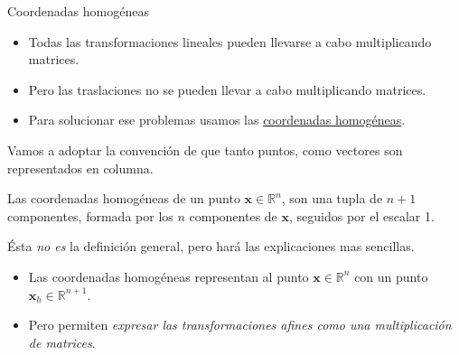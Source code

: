 \begin{frame}{Coordenadas homogéneas}

\begin{itemize}
    \item Todas las transformaciones lineales pueden llevarse a cabo multiplicando matrices.
    \item Pero las traslaciones no se pueden llevar a cabo multiplicando matrices.
    \item Para solucionar ese problemas usamos las \href{https://en.wikipedia.org/wiki/Homogeneous_coordinates}{coordenadas homogéneas}.
\end{itemize}
Vamos a adoptar la convención de que tanto puntos, como vectores son representados en columna.
\begin{block}{}
    Las coordenadas homogéneas de un punto $\mathbf{x} \in \mathbb{R}^n$, son una tupla de $n+1$ componentes, formada por los $n$ componentes de $\mathbf{x}$, seguidos por el escalar 1.
\end{block}
Ésta \emph{no es} la definición general, pero hará las explicaciones mas sencillas.
\begin{itemize}
    \item Las coordenadas homogéneas representan al punto $\mathbf{x} \in \mathbb{R}^n$ con un punto $\mathbf{x}_{h} \in \mathbb{R}^{n+1}$.
    \item Pero permiten \emph{expresar las transformaciones afines como una multiplicación de matrices}.
\end{itemize}

\end{frame}

